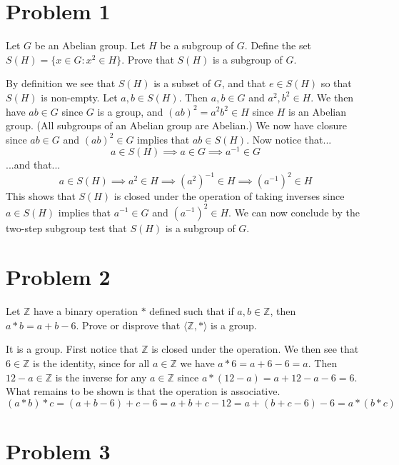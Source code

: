 \documentclass{article}
\begin{document}
\section*{Problem 1}

Let $G$ be an Abelian group.  Let $H$ be a subgroup of $G$.  Define the
set $S(H)=\{x\in G:x^2\in H\}$.  Prove that $S(H)$ is a subgroup of $G$.

By definition we see that $S(H)$ is a subset of $G$, and that $e\in S(H)$ so
that $S(H)$ is non-empty.  Let $a,b\in S(H)$.
Then $a,b\in G$ and $a^2,b^2\in H$.  We then have $ab\in G$ since $G$ is a group,
and $(ab)^2 = a^2b^2 \in H$ since $H$ is an Abelian group.  (All subgroups
of an Abelian group are Abelian.)  We now have closure since $ab\in G$ and
$(ab)^2\in G$ implies that $ab\in S(H)$.
Now notice that...
\begin{equation*}
a\in S(H)\implies a\in G\implies a^{-1}\in G
\end{equation*}
...and that...
\begin{equation*}
a\in S(H)\implies a^2\in H\implies (a^2)^{-1}\in H\implies (a^{-1})^2\in H
\end{equation*}
This shows that $S(H)$ is closed under the operation of taking inverses
since $a\in S(H)$ implies that $a^{-1}\in G$ and $(a^{-1})^2\in H$.
We can now conclude by the two-step subgroup test that $S(H)$ is
a subgroup of $G$.

\section*{Problem 2}

Let $\mathbb{Z}$ have a binary operation $*$ defined such that if $a,b\in\mathbb{Z}$,
then $a*b=a+b-6$.  Prove or disprove that $\langle\mathbb{Z},*\rangle$ is a group.

It is a group.  First notice that $\mathbb{Z}$ is closed under the operation.
We then see that $6\in\mathbb{Z}$ is the identity, since for all $a\in\mathbb{Z}$
we have $a*6=a+6-6=a$.  Then $12-a\in\mathbb{Z}$ is the inverse for any $a\in\mathbb{Z}$
since $a*(12-a)=a+12-a-6=6$.  What remains to be shown is that the operation is
associative.
\begin{equation*}
(a*b)*c = (a+b-6)+c-6 = a+b+c-12 = a+(b+c-6)-6 = a*(b*c)
\end{equation*}

\section*{Problem 3}
\end{document}
